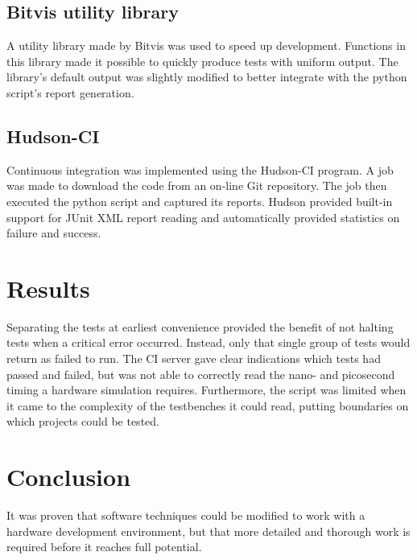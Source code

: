 \documentclass[twoside]{article}
\begin{document}
\begin{multicols}{2}
\subsection{Bitvis utility library}
A utility library made by Bitvis was used to speed up development. Functions in this library made it possible to quickly produce tests with uniform output. The library's default output was slightly modified to better integrate with the python script's report generation.

\subsection{Hudson-CI}
Continuous integration was implemented using the Hudson-CI program. A job was made to download the code from an on-line Git repository. The job then executed the python script and captured its reports. Hudson provided built-in support for JUnit XML report reading and automatically provided statistics on failure and success.

\section{Results}
Separating the tests at earliest convenience provided the benefit of not halting tests when a critical error occurred. Instead, only that single group of tests would return as failed to run. The CI server gave clear indications which tests had passed and failed, but was not able to correctly read the nano- and picosecond timing a hardware simulation requires. Furthermore, the script was limited when it came to the complexity of the testbenches it could read, putting boundaries on which projects could be tested.

\section{Conclusion}
It was proven that software techniques could be modified to work with a hardware development environment, but that more detailed and thorough work is required before it reaches full potential. 

\renewcommand*{\bibfont}{\footnotesize}
\printbibliography


\end{multicols}
\end{document}
